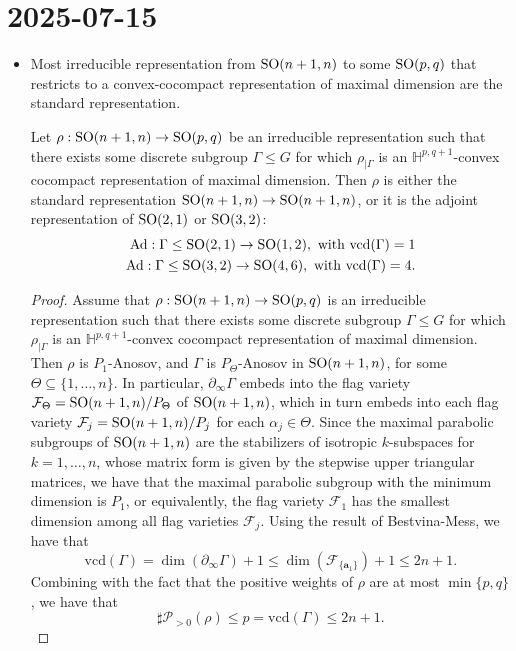 \documentclass{report}
\begin{document}
\section{2025-07-15}
\begin{itemize}
\item Most irreducible representation from $\operatorname{{\mathrm{SO}}}(n+1,n)$ to some $\operatorname{{\mathrm{SO}}}(p,q)$ that restricts to a convex-cocompact representation of maximal dimension are the standard representation.
\begin{lemma}
    Let $\rho: \operatorname{{\mathrm{SO}}}(n+1,n) \to \operatorname{{\mathrm{SO}}}(p,q)$ be an irreducible representation such that there exists some discrete subgroup $\Gamma \leq G$ for which $\rho_{|\Gamma}$ is an $\mathbb H^{p,q+1}$-convex cocompact representation of maximal dimension.
    Then $\rho$ is either the standard representation $\operatorname{{\mathrm{SO}}}(n+1,n) \to \operatorname{{\mathrm{SO}}}(n+1,n)$, or it is the adjoint representation of $\operatorname{{\mathrm{SO}}}(2,1)$ or $\operatorname{{\mathrm{SO}}}(3,2)$:
    \begin{align*}
        \operatorname{Ad}: \Gamma \leq \operatorname{{\mathrm{SO}}}(2,1) \to \operatorname{{\mathrm{SO}}}(1,2), \text{ with } \mathrm{vcd}(\Gamma) = 1\\
        \operatorname{Ad}: \Gamma \leq \operatorname{{\mathrm{SO}}}(3,2) \to \operatorname{{\mathrm{SO}}}(4,6), \text{ with } \mathrm{vcd}(\Gamma) = 4.
    \end{align*}
\end{lemma}
\begin{proof}
    Assume that $\rho: \operatorname{{\mathrm{SO}}}(n+1,n) \to \operatorname{{\mathrm{SO}}}(p,q)$ is an irreducible representation such that there exists some discrete subgroup $\Gamma \leq G$ for which $\rho_{|\Gamma}$ is an $\mathbb H^{p,q+1}$-convex cocompact representation of maximal dimension.
    Then $\rho$ is $P_1$-Anosov, and $\Gamma$ is $P_\Theta$-Anosov in $\operatorname{{\mathrm{SO}}}(n+1,n)$, for some $\Theta \subseteq \{1,\ldots,n\}$.
    In particular, $\partial_\infty \Gamma$ embeds into the flag variety $\mathcal F_\Theta = \operatorname{{\mathrm{SO}}}(n+1,n) / P_\Theta$ of $\operatorname{{\mathrm{SO}}}(n+1,n)$, which in turn embeds into each flag variety $\mathcal F_j = \operatorname{{\mathrm{SO}}}(n+1,n) / P_j$ for each $\alpha_j \in \Theta$.
    Since the maximal parabolic subgroups of $\operatorname{{\mathrm{SO}}}(n+1,n)$ are the stabilizers of isotropic $k$-subspaces for $k = 1, \ldots, n$, whose matrix form is given by the stepwise upper triangular matrices, we have that the maximal parabolic subgroup with the minimum dimension is $P_1$, or equivalently, the flag variety $\mathcal F_1$ has the smallest dimension among all flag varieties $\mathcal F_j$.
    Using the result of Bestvina-Mess, we have that 
    \[
    \mathrm{vcd}(\Gamma) = \dim(\partial_\infty \Gamma) + 1 \leq \dim(\mathcal F_{\{\mathbf a_1\}}) + 1 \leq 2n+1.
    \]
    Combining with the fact that the positive weights of $\rho$ are at most $\min\{p,q\}$, we have that
    \[
    \sharp \mathcal P_{>0}(\rho) \leq p = \mathrm{vcd}(\Gamma) \leq 2n+1.
    \]


\end{proof}
\end{itemize}
\end{document}
